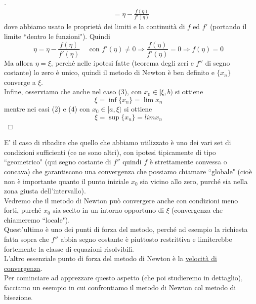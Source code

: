 \documentclass[12pt]{article}
\begin{document}
\begin{proof}[\unskip\nopunct]
\[\begin{split}
	& = \eta - \frac{f(\eta)}{f'(\eta)}
\end{split} \]
dove abbiamo usato le proprietà dei limiti e la continuità di $f$ ed $f'$ (portando il limite ``dentro le funzioni"). Quindi 
\[ \eta=\eta-\frac{f(\eta)}{f'(\eta)} \quad \text{ con } f'(\eta) \neq 0 \Longrightarrow \frac{f(\eta)}{f'(\eta)} = 0 \Longrightarrow f(\eta)=0 \]
Ma allora $\eta=\xi$, perché nelle ipotesi fatte (teorema degli zeri e $f''$ di segno costante) lo zero è unico, quindi il metodo di Newton è ben definito e $\{x_n\}$ converge a $\xi$.\\
Infine, osserviamo che anche nel caso (3), con $x_0 \in [\xi,b)$ si ottiene \[\xi= \inf\{x_n\}=\lim x_n\] 
mentre nei casi (2) e (4) con $x_0 \in [a,\xi)$ si ottiene \[\xi= \sup \{x_n\}=lim x_n\] 
\end{proof}
E' il caso di ribadire che quello che abbiamo utilizzato è uno dei vari set di condizioni sufficienti (ce ne sono altri), con ipotesi tipicamente di tipo ``geometrico" (qui segno costante di $f''$ quindi $f$ è strettamente convessa o concava) che garantiscono una convergenza che possiamo chiamare ``globale" (cioè non è importante quanto il punto iniziale $x_0$ sia vicino allo zero, purché sia nella zona giusta dell'intervallo).\\
Vedremo che il metodo di Newton può convergere anche con condizioni meno forti, purché $x_0$ sia scelto in un intorno opportuno di $\xi$ (convergenza che chiameremo ``locale").\\
Quest'ultimo è uno dei punti di forza del metodo, perché ad esempio la richiesta fatta sopra che $f''$ abbia segno costante è piuttosto restrittiva e limiterebbe fortemente la classe di equazioni risolvibili.\\
L'altro essenziale punto di forza del metodo di Newton è la \uline{velocità di convergenza}.\\
Per cominciare ad apprezzare questo aspetto (che poi studieremo in dettaglio), facciamo un esempio in cui confrontiamo il metodo di Newton col metodo di bisezione.
\end{document}
